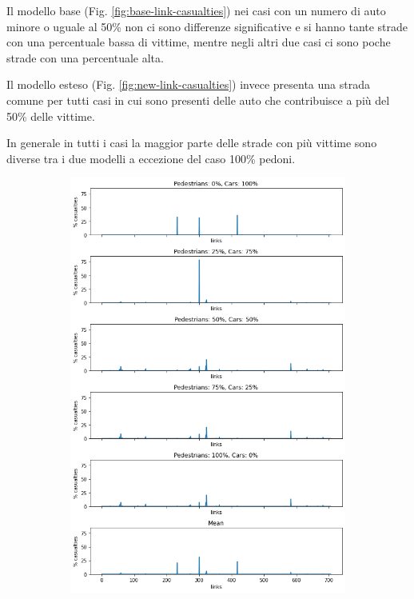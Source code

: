 Il modello base (Fig. \ref{fig:base-link-casualties}) nei casi con un numero di auto minore o uguale al 50\%
non ci sono differenze significative e si hanno tante strade con una percentuale bassa di vittime, 
mentre negli altri due casi ci sono poche strade con una percentuale alta.

Il modello esteso (Fig. \ref{fig:new-link-casualties}) invece presenta una strada comune per tutti casi 
in cui sono presenti delle auto che contribuisce a più del 50\% delle vittime.

In generale in tutti i casi la maggior parte delle strade con più vittime sono diverse tra i due modelli a eccezione del caso 
100\% pedoni.

\begin{figure}[ht]
    \centering
    \begin{subfigure}{0.475\textwidth}
        \centering
        \includegraphics[width=\textwidth]{images/analisi/base_links_casualties}

\end{subfigure}
\end{figure}
